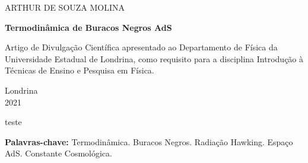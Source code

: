 \documentclass[12pt,a4paper,oneside,brazil]{abntex2}
\theoremstyle{definition}
\numberwithin{defin}{section}
\numberwithin{thm}{section}
\numberwithin{notation}{section}
\theoremstyle{remark}
\numberwithin{exmp}{section}
\numberwithin{p}{section}
\numberwithin{lema}{section}
\begin{document}
	\cleardoublepage{}
	
	\thispagestyle{empty}
	\begin{center}
		{\Large{}ARTHUR DE SOUZA MOLINA}
		\par\end{center}{\Large \par}
	
	\begin{center}
		\vfill{}
		\par\end{center}
	
	\begin{DoubleSpace}
		\begin{center}
			\textbf{\Large{}Termodinâmica de Buracos Negros AdS}
			\par\end{center}{\Large \par}
	\end{DoubleSpace}
	
	\begin{center}
		\vfill{}
	
		\par\end{center}
	
	\noindent \begin{flushright}
		\begin{minipage}[c]{9.5cm}%
			Artigo de Divulgação Científica apresentado ao Departamento de Física da Universidade Estadual de Londrina, como requisito para a disciplina Introdução à Técnicas de Ensino e Pesquisa em Física.
		\end{minipage}
		\par\end{flushright}
	
	\vfill{}
	
	\begin{center}
		Londrina\\
		2021
		\par\end{center}
	
	\newpage{}
	
	
		
	\setlength{\absparsep}{18pt}
	
	\begin{resumo}
		
		teste
		
		\textbf{Palavras-chave:} Termodinâmica. Buracos Negros. Radiação Hawking. Espaço AdS. Constante Cosmológica.
	\end{resumo}
	
\end{document}
